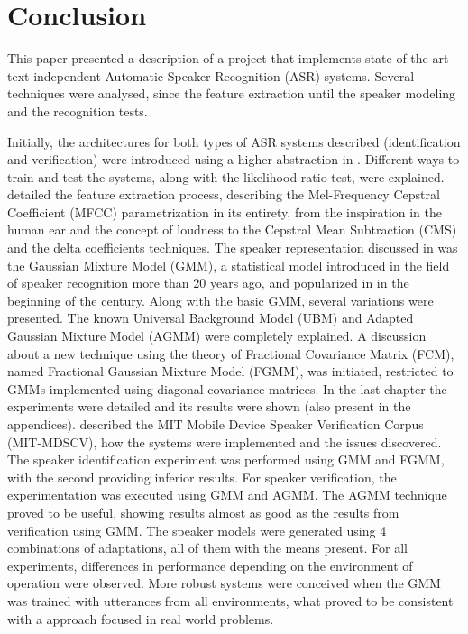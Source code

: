 \chapter{Conclusion}
\label{ch:conclusion}

This paper presented a description of a project that implements state-of-the-art text-independent Automatic Speaker Recognition (ASR) systems. Several techniques were analysed, since the feature extraction until the speaker modeling and the recognition tests.

Initially, the architectures for both types of ASR systems described (identification and verification) were introduced using a higher abstraction in . Different ways to train and test the systems, along with the likelihood ratio test, were explained.  detailed the feature extraction process, describing the Mel-Frequency Cepstral Coefficient (MFCC) parametrization in its entirety, from the inspiration in the human ear and the concept of loudness to the Cepstral Mean Subtraction (CMS) and the delta coefficients techniques. The speaker representation discussed in  was the Gaussian Mixture Model (GMM), a statistical model introduced in the field of speaker recognition more than 20 years ago, and popularized in in the beginning of the century. Along with the basic GMM, several variations were presented. The known Universal Background Model (UBM) and Adapted Gaussian Mixture Model (AGMM) were completely explained. A discussion about a new technique using the theory of Fractional Covariance Matrix (FCM), named Fractional Gaussian Mixture Model (FGMM), was initiated, restricted to GMMs implemented using diagonal covariance matrices. In the last chapter the experiments were detailed and its results were shown (also present in the appendices).  described the MIT Mobile Device Speaker Verification Corpus (MIT-MDSCV), how the systems were implemented and the issues discovered. The speaker identification experiment was performed using GMM and FGMM, with the second providing inferior results. For speaker verification, the experimentation was executed using GMM and AGMM. The AGMM technique proved to be useful, showing results almost as good as the results from verification using GMM. The speaker models were generated using 4 combinations of adaptations, all of them with the means present. For all experiments, differences in performance depending on the environment of operation were observed. More robust systems were conceived when the GMM was trained with utterances from all environments, what proved to be consistent with a approach focused in real world problems.

